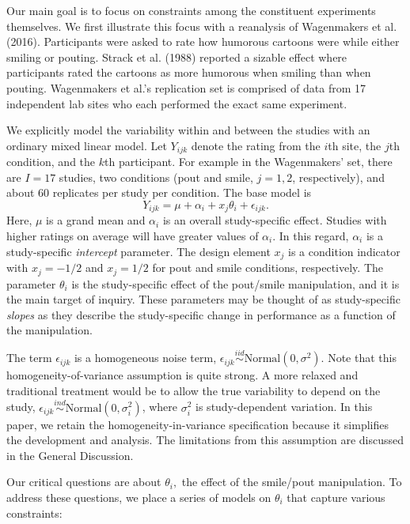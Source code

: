 \documentclass[english,man]{apa6}
\theoremstyle{definition}
\theoremstyle{definition}
\theoremstyle{definition}
\theoremstyle{remark}
\begin{document}
Our main goal is to focus on constraints among the constituent
experiments themselves. We first illustrate this focus with a reanalysis
of Wagenmakers et al. (2016). Participants were asked to rate how
humorous cartoons were while either smiling or pouting. Strack et al.
(1988) reported a sizable effect where participants rated the cartoons
as more humorous when smiling than when pouting. Wagenmakers et al.'s
replication set is comprised of data from 17 independent lab sites who
each performed the exact same experiment.

We explicitly model the variability within and between the studies with
an ordinary mixed linear model. Let \(Y_{ijk}\) denote the rating from
the \(i\)th site, the \(j\)th condition, and the \(k\)th participant.
For example in the Wagenmakers' set, there are \(I=17\) studies, two
conditions (pout and smile, \(j=1,2\), respectively), and about 60
replicates per study per condition. The base model is \[
Y_{ijk} = \mu+\alpha_i + x_j\theta_i+\epsilon_{ijk}.
\] Here, \(\mu\) is a grand mean and \(\alpha_i\) is an overall
study-specific effect. Studies with higher ratings on average will have
greater values of \(\alpha_i\). In this regard, \(\alpha_i\) is a
study-specific \emph{intercept} parameter. The design element \(x_j\) is
a condition indicator with \(x_j=-1/2\) and \(x_j=1/2\) for pout and
smile conditions, respectively. The parameter \(\theta_i\) is the
study-specific effect of the pout/smile manipulation, and it is the main
target of inquiry. These parameters may be thought of as study-specific
\emph{slopes} as they describe the study-specific change in performance
as a function of the manipulation.

The term \(\epsilon_{ijk}\) is a homogeneous noise term,
\(\epsilon_{ijk}\stackrel{iid}{\sim}\mbox{Normal}(0,\sigma^2)\). Note
that this homogeneity-of-variance assumption is quite strong. A more
relaxed and traditional treatment would be to allow the true variability
to depend on the study,
\(\epsilon_{ijk}\stackrel{ind}{\sim}\mbox{Normal}(0,\sigma^2_i)\), where
\(\sigma^2_i\) is study-dependent variation. In this paper, we retain
the homogeneity-in-variance specification because it simplifies the
development and analysis. The limitations from this assumption are
discussed in the General Discussion.

Our critical questions are about \(\theta_i,\) the effect of the
smile/pout manipulation. To address these questions, we place a series
of models on \(\theta_i\) that capture various constraints:
\end{document}
